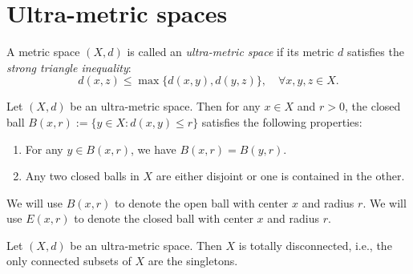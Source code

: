\section{Ultra-metric spaces}

    \begin{definition}\label{def:ultra-metric_space}
        A metric space \((X,d)\) is called an \emph{ultra-metric space} if its metric \(d\) satisfies the \emph{strong triangle inequality}:
        \[ d(x,z) \leq \max\{d(x,y), d(y,z)\},\quad\forall x,y,z\in X. \]
    \end{definition}

    \begin{proposition}\label{prop:balls_in_ultra-metric_space}
        Let \((X,d)\) be an ultra-metric space.
        Then for any \(x \in X\) and \(r > 0\), the closed ball \(B(x,r) := \{y \in X\colon d(x,y) \leq r\}\) satisfies the following properties:
        \begin{enumerate}
            \item For any \(y \in B(x,r)\), we have \(B(x,r) = B(y,r)\).
            \item Any two closed balls in \(X\) are either disjoint or one is contained in the other.
        \end{enumerate}
    \end{proposition}

    We will use \(B(x,r)\) to denote the open ball with center \(x\) and radius \(r\).
    We will use \(E(x,r)\) to denote the closed ball with center \(x\) and radius \(r\).

    \begin{proposition}\label{prop:ultra-metric_space_is_totally_disconnected}
        Let \((X,d)\) be an ultra-metric space.
        Then \(X\) is totally disconnected, i.e., the only connected subsets of \(X\) are the singletons.
    \end{proposition}
